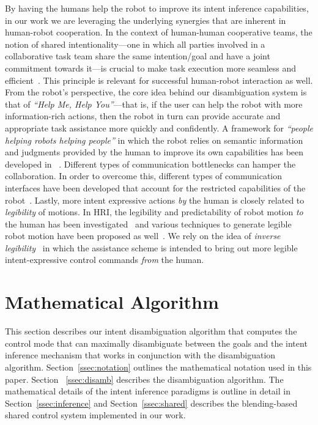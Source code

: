 By having the humans help the robot to improve its intent inference capabilities, in our work we are leveraging the underlying synergies that are inherent in human-robot cooperation. In the context of human-human cooperative teams, the notion of shared intentionality---one in which all parties involved in a collaborative task team share the same intention/goal and have a joint commitment towards it---is crucial to make task execution more seamless and efficient~\cite{tomasello2007shared, tomasello2010gap}. This principle is relevant for successful human-robot interaction as well. From the robot's perspective, the core idea behind our disambiguation system is that of \textit{``Help Me, Help You''}---that is, if the user can help the robot with more information-rich actions, then the robot in turn can provide accurate and appropriate task assistance more quickly and confidently. A framework for \textit{``people helping robots helping people''} in which the robot relies on semantic information and judgments provided by the human to improve its own capabilities has been developed in ~\cite{sorokin2010people}. Different types of communication bottlenecks can hamper the collaboration. In order to overcome this, different types of communication interfaces have been developed that account for the restricted capabilities of the robot~\cite{goodfellow2010help}. Lastly, more intent expressive actions \textit{by} the human is closely related to \textit{legibility} of motions. In HRI, the legibility and predictability of robot motion \textit{to} the human has been investigated~\cite{dragan2013legibility} and various techniques to generate legible robot motion have been proposed as well~\cite{holladay2014legible}. We rely on the idea of \textit{inverse legibility}~\cite{gopinath2017mode} in which the assistance scheme is intended to bring out more legible intent-expressive control commands \textit{from} the human. 
\section{Mathematical Algorithm}\label{sec:ma}
This section describes our intent disambiguation algorithm that computes the control mode that can maximally disambiguate between the goals and the intent inference mechanism that works in conjunction with the disambiguation algorithm. Section~\ref{ssec:notation} outlines the mathematical notation used in this paper. Section ~\ref{ssec:disamb} describes the disambiguation algorithm. The mathematical details of the intent inference paradigms is outline in detail in Section~\ref{ssec:inference} and Section~\ref{ssec:shared} describes the blending-based shared control system implemented in our work. 
